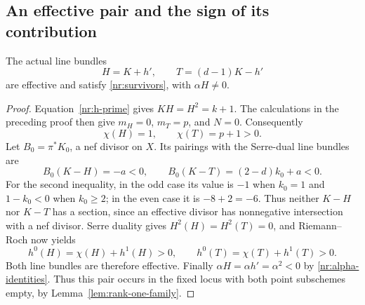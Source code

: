 \subsection{An effective pair and the sign of its contribution}

\begin{lemma}\label{nr:effective-pair}
The actual line bundles
\[
 H=K+h',\qquad T=(d-1)K-h'
\]
are effective and satisfy \eqref{nr:survivors}, with $\alpha H\ne0$.
\end{lemma}

\begin{proof}
Equation~\eqref{nr:h-prime} gives
$KH=H^2=k+1$.  The calculations in the preceding proof then give
$m_H=0$, $m_T=p$, and $N=0$.  Consequently
\[
 \chi(H)=1,\qquad \chi(T)=p+1>0.
\]
Let $B_0=\pi^*K_0$, a nef divisor on $X$.  Its pairings with the
Serre-dual line bundles are
\[
 B_0(K-H)=-a<0,\qquad
 B_0(K-T)=(2-d)k_0+a<0.
\]
For the second inequality, in the odd case its value is $-1$ when
$k_0=1$ and $1-k_0<0$ when $k_0\geq2$; in the even case it is
$-8+2=-6$.  Thus neither $K-H$ nor $K-T$ has a section, since an
effective divisor has nonnegative intersection with a nef divisor.
Serre duality gives $H^2(H)=H^2(T)=0$, and Riemann--Roch now yields
\[
 h^0(H)=\chi(H)+h^1(H)>0,\qquad
 h^0(T)=\chi(T)+h^1(T)>0.
\]
Both line bundles are therefore effective.  Finally
$\alpha H=\alpha h'=\alpha^2<0$ by
\eqref{nr:alpha-identities}.
Thus this pair occurs in the fixed locus with both point subschemes
empty, by Lemma~\ref{lem:rank-one-family}.
\end{proof}

